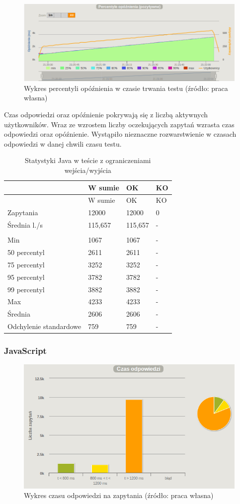 \documentclass[12pt,twoside]{article}
\begin{document}
\begin{figure}[htbp]
\centering
\includegraphics[resolution=150]{test_results/java/file/screenshots/latency_percentile.png}
\caption{Wykres percentyli opóźnienia w czasie trwania testu (źródło: praca własna)}
\end{figure}

Czas odpowiedzi oraz opóźnienie pokrywają się z liczbą aktywnych
użytkowników. Wraz ze wzrostem liczby oczekujących zapytań wzrasta czas
odpowiedzi oraz opóźnienie. Wystąpiło nieznaczne rozwarstwienie w
czasach odpowiedzi w danej chwili czasu testu.

\begin{longtable}[c]{@{}llll@{}}
\caption{Statystyki Java w teście z ograniczeniami
wejścia/wyjścia}\tabularnewline
\toprule
& W sumie & OK & KO\tabularnewline
\midrule
\endfirsthead
\toprule
& W sumie & OK & KO\tabularnewline
\midrule
\endhead
Zapytania & 12000 & 12000 & 0\tabularnewline
Średnia l./s & 115,657 & 115,657 & -\tabularnewline
& & &\tabularnewline
Min & 1067 & 1067 & -\tabularnewline
50 percentyl & 2611 & 2611 & -\tabularnewline
75 percentyl & 3252 & 3252 & -\tabularnewline
95 percentyl & 3782 & 3782 & -\tabularnewline
99 percentyl & 3882 & 3882 & -\tabularnewline
Max & 4233 & 4233 & -\tabularnewline
Średnia & 2606 & 2606 & -\tabularnewline
Odchylenie standardowe & 759 & 759 & -\tabularnewline
\bottomrule
\end{longtable}

\clearpage

\subsubsection{JavaScript}\label{javascript-3}

\begin{figure}[htbp]
\centering
\includegraphics[resolution=150]{test_results/js/file/screenshots/response_times.png}
\caption{Wykres czasu odpowiedzi na zapytania (źródło: praca własna)}
\end{figure}
\end{document}
